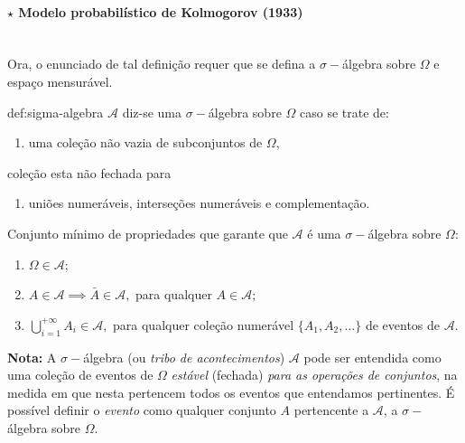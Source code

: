 \paragraph[1.1.2.1 Modelo probabilístico de Kolmogorov]{$\pmb{\star}$ Modelo probabilístico de Kolmogorov (1933)}\mbox{}\\
Ora, o enunciado de tal definição requer que se defina a $\sigma-$álgebra sobre $\Omega$ e espaço mensurável.

\begin{theo}{def:sigma-algebra}\label{def:sigma-algebra}
    $\mathcal{A}$ diz-se uma $\sigma-$álgebra sobre $\Omega$ caso se trate de:

   \vspace{-1 em}
    \begin{enumerate}[label=$\bullet$]
        \item uma coleção não vazia de subconjuntos de $\Omega$,
    \end{enumerate}

    \vspace{-1em}
    \noindent coleção esta não fechada para

    \vspace{-1 em}
    \begin{enumerate}[label=$\bullet$]
        \item uniões numeráveis, interseções numeráveis e complementação.
    \end{enumerate}

    \noindent Conjunto mínimo de propriedades que garante que $\mathcal{A}$ é uma $\sigma-$álgebra sobre $\Omega$:

    \vspace{-1 em}
    \begin{enumerate}
        \item $\Omega \in \mathcal{A}$;
        \item $A \in \mathcal{A} \implies \bar{A} \in \mathcal{A},$ para qualquer $A \in \mathcal{A}$;
        \item $\bigcup_{i=1}^{+\infty} A_i \in \mathcal{A},$ para qualquer coleção numerável $\{A_1, A_2,\dots\}$ de eventos de $\mathcal{A}$.
    \end{enumerate}

    \noindent \textbf{Nota:} A $\sigma-$álgebra (ou \textit{tribo de acontecimentos}) $\mathcal{A}$ pode ser entendida como uma coleção de eventos de $\Omega$ \textit{estável} (fechada) \textit{para as operações de conjuntos}, na medida em que nesta pertencem todos os eventos que entendamos pertinentes. É possível definir o \textit{evento} como qualquer conjunto $A$ pertencente a $\mathcal{A}$, a $\sigma-$álgebra sobre $\Omega$.\cite{Morais2020} 
\end{theo}

